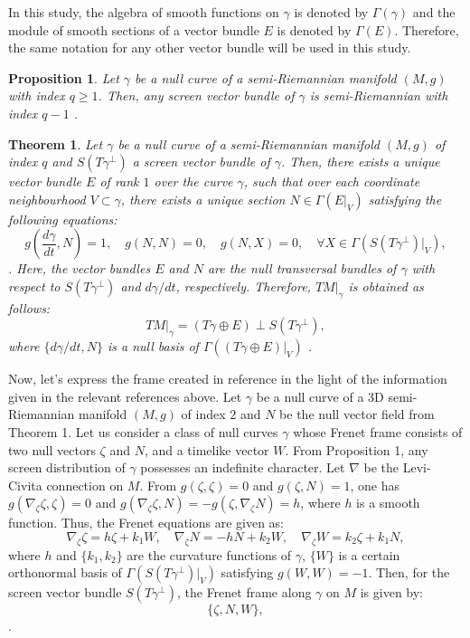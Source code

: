 \documentclass [reqno]{amsart}
\newtheorem{theorem}{Theorem}
\theoremstyle{plain}
\newtheorem{proposition}{Proposition}
\numberwithin{equation}{section}
\begin{document}
In this study, the algebra of smooth functions on $\gamma$ is denoted by $\Gamma(\gamma)$ and the module of smooth sections of a vector bundle $E$ is denoted by $\Gamma(E)$. Therefore, the same notation for any other vector bundle will be used in this study.

\begin{proposition}
Let $\gamma$ be a null curve of a semi-Riemannian manifold $(M,g)$ with index $q \geq 1$. Then, any screen vector bundle of $\gamma$ is semi-Riemannian with index $q-1$ \cite{4}.
\end{proposition}

\begin{theorem}
Let $\gamma$ be a null curve of a semi-Riemannian manifold $(M,g)$ of index $q$ and $S(T\gamma^\perp)$ a screen vector bundle of $\gamma$. Then, there exists a unique vector bundle $E$ of rank $1$ over the curve $\gamma$, such that over each coordinate neighbourhood $V \subset \gamma$, there exists a unique section $N \in \Gamma(E|_V)$ satisfying the following equations:
\begin{equation}
g\left(\frac{d\gamma}{dt}, N\right) = 1, \quad g(N,N) = 0, \quad g(N,X) = 0, \quad \forall X \in \Gamma(S(T\gamma^\perp)|_V),
\end{equation}
\cite{4,11}. Here, the vector bundles $E$ and $N$ are the null transversal bundles of $\gamma$ with respect to $S(T\gamma^\perp)$ and $d\gamma/dt$, respectively. Therefore, $TM|_\gamma$ is obtained as follows:
\[
TM|_\gamma = (T\gamma \oplus E) \perp S(T\gamma^\perp),
\]
where $\{d\gamma/dt, N\}$ is a null basis of $\Gamma((T\gamma \oplus E)|_V)$ \cite{4,11}.
\end{theorem}

Now, let's express the frame created in reference \cite{8} in the light of the information given in the relevant references above. Let $\gamma$ be a null curve of a 3D semi-Riemannian manifold $(M,g)$ of index $2$ and $N$ be the null vector field from Theorem 1. Let us consider a class of null curves $\gamma$ whose Frenet frame consists of two null vectors $\zeta$ and $N$, and a timelike vector $W$. From Proposition 1, any screen distribution of $\gamma$ possesses an indefinite character. Let $\nabla$ be the Levi-Civita connection on $M$. From $g(\zeta,\zeta)=0$ and $g(\zeta,N)=1$, one has $g(\nabla_\zeta \zeta, \zeta)=0$ and $g(\nabla_\zeta \zeta, N) = -g(\zeta, \nabla_\zeta N) = h$, where $h$ is a smooth function. Thus, the Frenet equations are given as:
\begin{equation}
\nabla_\zeta \zeta = h\zeta + k_1 W, \quad \nabla_\zeta N = -hN + k_2 W, \quad \nabla_\zeta W = k_2 \zeta + k_1 N,
\end{equation}
where $h$ and $\{k_1, k_2\}$ are the curvature functions of $\gamma$, $\{W\}$ is a certain orthonormal basis of $\Gamma(S(T\gamma^\perp)|_V)$ satisfying $g(W,W) = -1$. Then, for the screen vector bundle $S(T\gamma^\perp)$, the Frenet frame along $\gamma$ on $M$ is given by:
\begin{equation}
\{\zeta, N, W\},
\end{equation}
\cite{6,8}.
\end{document}
